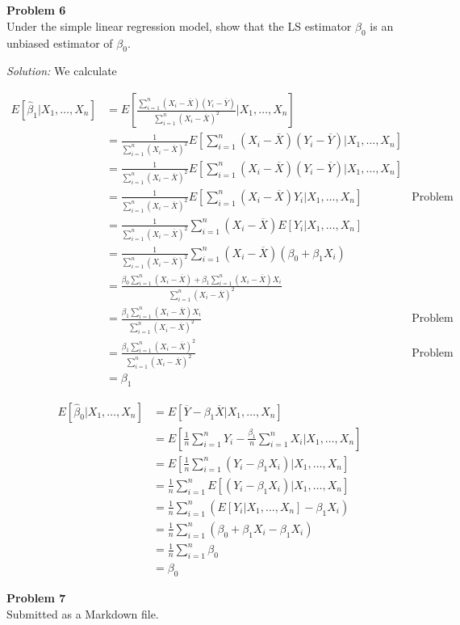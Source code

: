\documentclass{article}
\newenvironment{problem}[2][Problem]
    { \begin{mdframed}[backgroundcolor=gray!20] \textbf{#1 #2} \\}
    {  \end{mdframed}}
\newenvironment{solution}
    {\textit{Solution:}}
    {}
\begin{document}
\begin{problem}{6}
Under the simple linear regression model, show that the LS estimator $\hat \beta_0$ is an unbiased
estimator of $\beta_0$.
\end{problem}
\begin{solution}
We calculate

\begin{align*}
E[\hat \beta_1 | X_1, \ldots, X_n] &=  E \left [ \frac{\sum_{i = 1}^n (X_i - \overline{X}) (Y_i - \overline{Y})}{ \sum_{i = 1}^n (X_i - \overline{X})^2} | X_1, \ldots, X_n \right] \\
&= \frac{1}{\sum_{i = 1}^n (X_i - \overline{X})^2} E \left [ \sum_{i = 1}^n (X_i - \overline{X}) (Y_i - \overline{Y}) | X_1, \ldots, X_n\right ]\\
&= \frac{1}{\sum_{i = 1}^n (X_i - \overline{X})^2} E \left [ \sum_{i = 1}^n (X_i - \overline{X}) (Y_i - \overline{Y})| X_1, \ldots, X_n \right ] \\
&=  \frac{1}{\sum_{i = 1}^n (X_i - \overline{X})^2} E \left [ \sum_{i = 1}^n (X_i - \overline{X}) Y_i | X_1, \ldots, X_n \right ]  & \text{Problem 2(b)} \\
&=  \frac{1}{\sum_{i = 1}^n (X_i - \overline{X})^2} \sum_{i = 1}^n (X_i - \overline{X})  E \left [Y_i | X_1, \ldots, X_n \right ] \\
&=  \frac{1}{\sum_{i = 1}^n (X_i - \overline{X})^2} \sum_{i = 1}^n (X_i - \overline{X}) (\beta_0 + \beta_1 X_i) \\
&=  \frac{\beta_0 \sum_{i = 1}^n (X_i - \overline{X})  + \beta_1 \sum_{i = 1}^n (X_i - \overline{X})X_i }{\sum_{i = 1}^n (X_i - \overline{X})^2} \\
&=  \frac{\beta_1 \sum_{i = 1}^n (X_i - \overline{X})X_i }{\sum_{i = 1}^n (X_i - \overline{X})^2} & \text{Problem 2(a)}\\
&=  \frac{\beta_1 \sum_{i = 1}^n (X_i - \overline{X})^2}{\sum_{i = 1}^n (X_i - \overline{X})^2} & \text{Problem 2(a)}\\
&= \beta_1
\end{align*} 

\begin{align*}
E[\hat \beta_0 | X_1, \ldots, X_n] &= E[\overline{Y} - \beta_1 \overline{X} | X_1,\ldots, X_n ] \\
&= E[\frac{1}{n} \sum_{i = 1}^n Y_i - \frac{ \beta_1}{n} \sum_{i = 1}^n X_i | X_1,\ldots, X_n ]\\
&= E[\frac{1}{n} \sum_{i = 1}^n (Y_i -  \beta_1X_i) | X_1,\ldots, X_n ]\\
&= \frac{1}{n} \sum_{i = 1}^n E[(Y_i -  \beta_1X_i) | X_1,\ldots, X_n ]\\
&= \frac{1}{n} \sum_{i = 1}^n (E[Y_i  | X_1,\ldots, X_n ] -  \beta_1X_i)\\
&= \frac{1}{n} \sum_{i = 1}^n (\beta_0 + \beta_1 X_i -  \beta_1X_i)\\
&= \frac{1}{n} \sum_{i = 1}^n \beta_0 \\
&= \beta_0
\end{align*}

\end{solution}

\begin{problem}{7}
Submitted as a  Markdown file. 
\end{problem}
\end{document}
